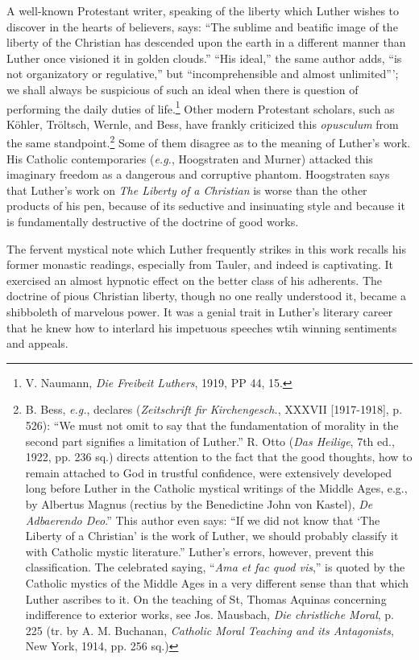 A well-known Protestant writer, speaking of the liberty which
Luther wishes to discover in the hearts of believers, says: “The sublime
and beatific image of the liberty of the Christian has descended
upon the earth in a different manner than Luther once visioned it in
golden clouds.” “His ideal,” the same author adds, “is not organizatory
or regulative,” but “incomprehensible and almost unlimited”’;
we shall always be suspicious of such an ideal when there is question of
performing the daily duties of life.\footnote
{V. Naumann, \textit{Die Freibeit Luthers}, 1919, PP 44, 15.}
Other modern Protestant
scholars, such as Köhler, Tröltsch, Wernle, and Bess, have frankly
criticized this \textit{opusculum} from the same standpoint.\footnote
{B. Bess, \textit{e.g.}, declares (\textit{Zeitschrift fir Kirchengesch.}, XXXVII [1917-1918], p. 526):
“We must not omit to say that the fundamentation of morality in the second part signifies
a limitation of Luther.” R. Otto (\textit{Das Heilige}, 7th ed., 1922, pp. 236 sq.) directs
attention to the fact that the good thoughts, how to remain attached to God in trustful
confidence, were extensively developed long before Luther in the Catholic mystical writings
of the Middle Ages, e.g., by Albertus Magnus (rectius by the Benedictine John von Kastel),
\textit{De Adbaerendo Deo}.” This author even says: “If we did not know that ‘The Liberty of a
Christian’ is the work of Luther, we should probably classify it with Catholic mystic
literature.” Luther’s errors, however, prevent this classification. The celebrated saying,
“\textit{Ama et fac quod vis},” is quoted by the Catholic mystics of the Middle Ages in a very
different sense than that which Luther ascribes to it. On the teaching of St, Thomas
Aquinas concerning indifference to exterior works, see Jos. Mausbach, \textit{Die christliche Moral},
p. 225 (tr. by A. M. Buchanan, \textit{Catholic Moral Teaching and its Antagonists}, New York,
1914, pp. 256 sq.)}
Some of them disagree as to the meaning of Luther’s work. His Catholic contemporaries
(\textit{e.g.}, Hoogstraten and Murner) attacked this imaginary
freedom as a dangerous and corruptive phantom. Hoogstraten says
that Luther’s work on \textit{The Liberty of a Christian} is worse than the
other products of his pen, because of its seductive and insinuating
style and because it is fundamentally destructive of the doctrine of
good works.

The fervent mystical note which Luther frequently strikes in this
work recalls his former monastic readings, especially from Tauler,
and indeed is captivating. It exercised an almost hypnotic effect on
the better class of his adherents. The doctrine of pious Christian liberty,
though no one really understood it, became a shibboleth of marvelous
power. It was a genial trait in Luther’s literary career that he
knew how to interlard his impetuous speeches wtih winning sentiments
and appeals.

